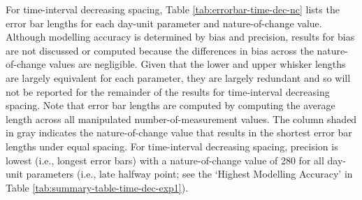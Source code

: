 \documentclass[
12pt, %
twoside,
english]{guelphthesis}
\theoremstyle{definition}
\theoremstyle{definition}
\theoremstyle{definition}
\theoremstyle{definition}
\theoremstyle{remark}
\begin{document}
For time-interval decreasing spacing, Table \ref{tab:errorbar-time-dec-nc} lists the error bar lengths for each day-unit parameter and nature-of-change value. Although modelling accuracy is determined by bias and precision, results for bias are not discussed or computed because the differences in bias across the nature-of-change values are negligible. Given that the lower and upper whisker lengths are largely equivalent for each parameter, they are largely redundant and so will not be reported for the remainder of the results for time-interval decreasing spacing. Note that error bar lengths are computed by computing the average length across all manipulated number-of-measurement values. The column shaded in gray indicates the nature-of-change value that results in the shortest error bar lengths under equal spacing. For time-interval decreasing spacing, precision is lowest (i.e., longest error bars) with a nature-of-change value of 280 for all day-unit parameters (i.e., late halfway point; see the `Highest Modelling Accuracy' in Table \ref{tab:summary-table-time-dec-exp1}).
\end{document}
